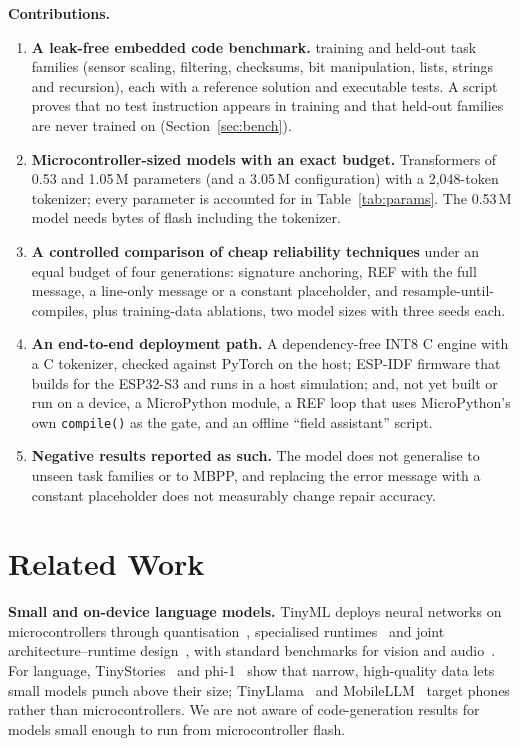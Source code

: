 \textbf{Contributions.}
\begin{enumerate}
\item \textbf{A leak-free embedded code benchmark.} \nfamtrain{} training and \nfamheld{} held-out task families (sensor scaling, filtering, checksums, bit manipulation, lists, strings and recursion), each with a reference solution and executable tests. A script proves that no test instruction appears in training and that held-out families are never trained on (Section~\ref{sec:bench}).
\item \textbf{Microcontroller-sized models with an exact budget.} Transformers of 0.53 and 1.05\,M parameters (and a 3.05\,M configuration) with a 2{,}048-token tokenizer; every parameter is accounted for in Table~\ref{tab:params}. The 0.53\,M model needs \dsmflashtotalbytes{} bytes of flash including the tokenizer.
\item \textbf{A controlled comparison of cheap reliability techniques} under an equal budget of four generations: signature anchoring, REF with the full message, a line-only message or a constant placeholder, and resample-until-compiles, plus training-data ablations, two model sizes with three seeds each.
\item \textbf{An end-to-end deployment path.} A dependency-free INT8 C engine with a C tokenizer, checked against PyTorch on the host; ESP-IDF firmware that builds for the ESP32-S3 and runs in a host simulation; and, not yet built or run on a device, a MicroPython module, a REF loop that uses MicroPython's own \texttt{compile()} as the gate, and an offline ``field assistant'' script.
\item \textbf{Negative results reported as such.} The model does not generalise to unseen task families or to MBPP, and replacing the error message with a constant placeholder does not measurably change repair accuracy.
\end{enumerate}

\section{Related Work}
\textbf{Small and on-device language models.} TinyML deploys neural networks on microcontrollers through quantisation~\cite{jacob2018quant}, specialised runtimes~\cite{david2021tflm} and joint architecture--runtime design~\cite{lin2020mcunet}, with standard benchmarks for vision and audio~\cite{banbury2021mlperftiny}. For language, TinyStories~\cite{eldan2023tinystories} and phi-1~\cite{gunasekar2023textbooks} show that narrow, high-quality data lets small models punch above their size; TinyLlama~\cite{zhang2024tinyllama} and MobileLLM~\cite{liu2024mobilellm} target phones rather than microcontrollers. We are not aware of code-generation results for models small enough to run from microcontroller flash.

